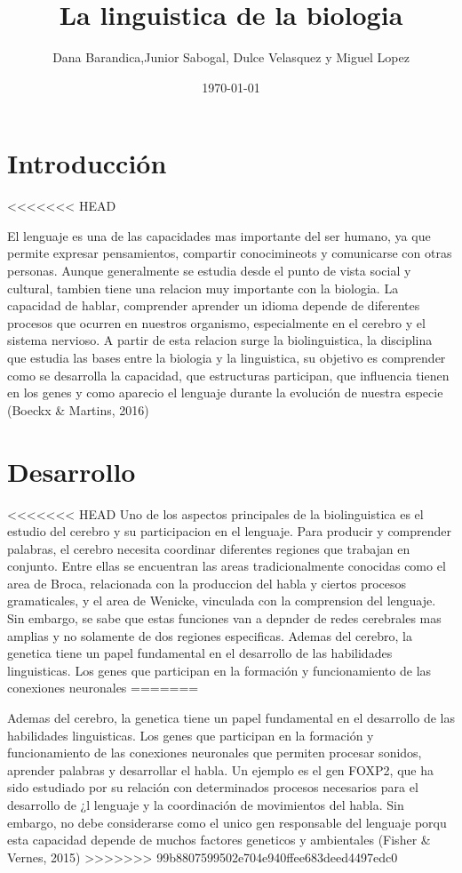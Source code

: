 \documentclass[12pt]{article}
\title{La linguistica de la biologia}
\author{Dana Barandica,Junior Sabogal, Dulce Velasquez y Miguel Lopez}
\date{\today}
\begin{document}
\maketitle

\section{Introducción}
<<<<<<< HEAD


El lenguaje es una de las capacidades mas importante del ser humano, ya que permite expresar pensamientos, compartir conocimineots y comunicarse con otras personas. Aunque generalmente se estudia desde el punto de vista social y cultural, tambien tiene una relacion muy importante con la biologia. La capacidad de hablar, comprender aprender un idioma depende de diferentes procesos que ocurren en nuestros organismo, especialmente en el cerebro y el sistema nervioso.
A partir de esta relacion surge la biolinguistica, la disciplina que estudia las bases entre la biologia y la linguistica, su objetivo es comprender como se desarrolla la capacidad, que estructuras participan, que influencia tienen en los genes y como aparecio el lenguaje durante la evolución de nuestra especie (Boeckx & Martins, 2016)



\section{Desarrollo}
<<<<<<< HEAD
Uno de los aspectos principales de la biolinguistica es el estudio del cerebro y su participacion en el lenguaje. Para producir y comprender palabras, el cerebro necesita coordinar diferentes regiones que trabajan en conjunto. Entre ellas se encuentran las areas tradicionalmente conocidas como el area de Broca, relacionada con la produccion del habla y ciertos procesos gramaticales, y el area de Wenicke, vinculada con la comprension del lenguaje. Sin embargo, se sabe que estas funciones van a depnder de redes cerebrales mas amplias y no solamente de dos regiones especificas.
Ademas del cerebro, la genetica tiene un papel fundamental en el desarrollo de las habilidades linguisticas. Los genes que participan en la formación y funcionamiento de las conexiones neuronales
=======

Ademas del cerebro, la genetica tiene un papel fundamental en el desarrollo de las habilidades linguisticas. Los genes que participan en la formación y funcionamiento de las conexiones neuronales que permiten procesar sonidos, aprender palabras y desarrollar el habla. Un ejemplo es el gen FOXP2, que ha sido estudiado por su relación con determinados procesos necesarios para el desarrollo de ¿l lenguaje y la coordinación de movimientos del habla. Sin embargo, no debe considerarse como el unico gen responsable del lenguaje porqu esta capacidad depende de muchos factores geneticos y ambientales (Fisher & Vernes, 2015)
>>>>>>> 99b8807599502e704e940ffee683deed4497edc0
\end{document}
